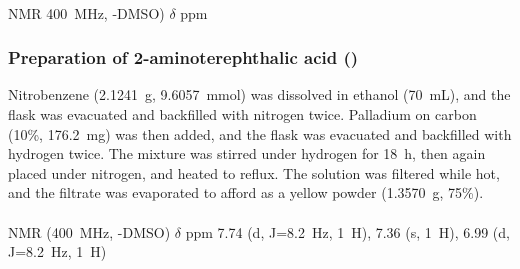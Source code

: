 \footnotesize\paragraph{}

 NMR 400~MHz, -DMSO) $\delta$ ppm 


\normalsize

\subsubsection{Preparation of 2-aminoterephthalic acid ()}
Nitrobenzene  (2.1241~g, 9.6057~mmol) was dissolved in ethanol (70~mL), and the flask was evacuated and backfilled with nitrogen twice. 
Palladium on carbon (10\%, 176.2~mg) was then added, and the flask was evacuated and backfilled with hydrogen twice. 
The mixture was stirred under hydrogen for 18~h, then again placed under nitrogen, and heated to reflux. 
The solution was filtered while hot, and the filtrate was evaporated to afford  as a yellow powder (1.3570~g, 75\%).

\footnotesize\paragraph{}

 NMR (400~MHz, -DMSO) $\delta$ ppm 
7.74 (d, J=8.2~Hz, 1~H), 7.36 (s, 1~H), 6.99 (d, J=8.2~Hz, 1~H)
\normalsize